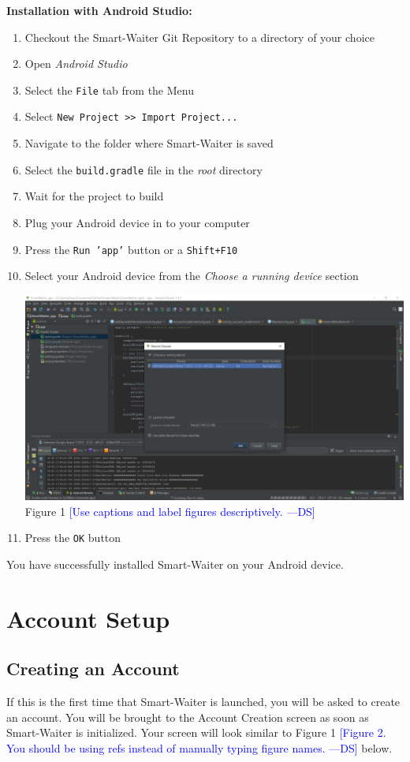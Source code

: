 \documentclass[12pt, titlepage]{article}
\newcommand{\authornote}[3]{\textcolor{#1}{[#3 ---#2]}}
\newcommand{\authornote}[3]{}
\newcommand{\ds}[1]{\authornote{blue}{DS}{#1}}
\begin{document}
\textbf{\newline Installation with Android Studio:}
	\begin{enumerate}
		\item Checkout the Smart-Waiter Git Repository to a directory of 				your choice
		\item Open \emph{Android Studio}
		\item Select the \texttt{File} tab from the Menu
		\item Select \texttt{New Project >> Import Project...}
		\item Navigate to the folder where Smart-Waiter is saved
		\item Select the \texttt{build.gradle} file in the \emph{root} 					directory
		\item Wait for the project to build
		\item Plug your Android device in to your computer 
		\item Press the \texttt{Run 'app'} button or a \texttt{Shift+F10}
		\item Select your Android device from the \emph{Choose a running device} section
		\begin{center}
			\includegraphics[width=1.0\textwidth]{android-studio.png}
			\linebreak Figure 1 \ds{Use captions and label figures descriptively.}
		\end{center}
		\item Press the \texttt{OK} button		
	\end{enumerate}
You have successfully installed Smart-Waiter on your Android device.

\section{Account Setup}
\subsection{Creating an Account}
If this is the first time that Smart-Waiter is launched, you will be asked to create an account. You will be brought to the Account Creation screen as soon as Smart-Waiter is initialized. Your screen will look similar to Figure 1 
\ds{Figure 2. You should be using refs instead of manually typing figure names.}
below. 
\end{document}
